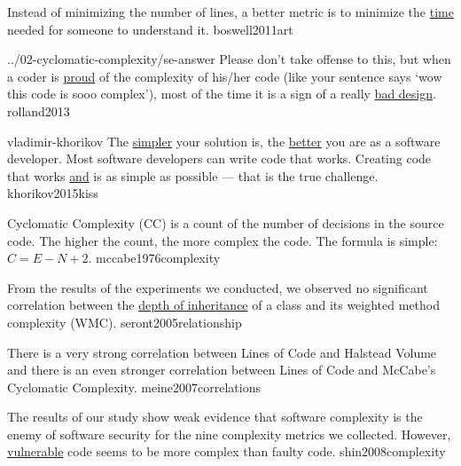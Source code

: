 \documentclass{article}
\begin{document}

  {Instead of minimizing the number of lines, a better metric is to minimize the \ul{time} needed for someone to understand it.}
  {boswell2011art}


\qte
  {../02-cyclomatic-complexity/se-answer}
  {Please don't take offense to this, but when a coder is \ul{proud} of the complexity of his/her code (like your sentence says `wow this code is sooo complex'), most of the time it is a sign of a really \ul{bad design}.}
  {rolland2013}

\qte
  {vladimir-khorikov}
  {The \ul{simpler} your solution is, the \ul{better} you are as a software developer. Most software developers can write code that works. Creating code that works \ul{and} is as simple as possible --- that is the true challenge.}
  {khorikov2015kiss}


  {Cyclomatic Complexity (CC) is a count of the number of decisions in the source code. The higher the count, the more complex the code. The formula is simple: \(C=E-N+2\).}
  {mccabe1976complexity}



  {From the results of the experiments we conducted, we observed no significant correlation between the \ul{depth of inheritance} of a class and its weighted method complexity (WMC).}
  {seront2005relationship}

  {There is a very strong correlation between Lines of Code and Halstead Volume and there is an even stronger correlation between Lines of Code and McCabe's Cyclomatic Complexity.}
  {meine2007correlations}

  {The results of our study show weak evidence that software complexity is the enemy of software security for the nine complexity metrics we collected. However, \ul{vulnerable} code seems to be more complex than faulty code.}
  {shin2008complexity}
\end{document}
